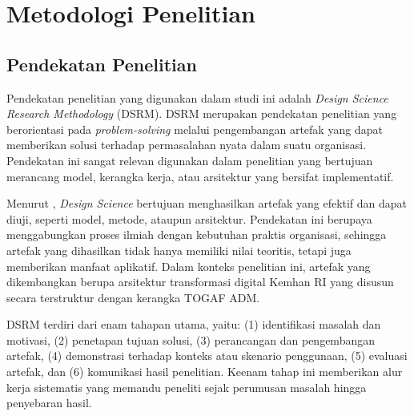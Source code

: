 

\section{Metodologi Penelitian}

\subsection{Pendekatan Penelitian}
Pendekatan penelitian yang digunakan dalam studi ini adalah \textit{Design Science Research Methodology} (DSRM).
DSRM merupakan pendekatan penelitian yang berorientasi pada \textit{problem-solving} melalui pengembangan artefak yang dapat memberikan solusi terhadap permasalahan nyata dalam suatu organisasi.
Pendekatan ini sangat relevan digunakan dalam penelitian yang bertujuan merancang model, kerangka kerja, atau arsitektur yang bersifat implementatif.

Menurut \textcite{Hevner2004}, \textit{Design Science} bertujuan menghasilkan artefak yang efektif dan dapat diuji, seperti model, metode, ataupun arsitektur.
Pendekatan ini berupaya menggabungkan proses ilmiah dengan kebutuhan praktis organisasi, sehingga artefak yang dihasilkan tidak hanya memiliki nilai teoritis, tetapi juga memberikan manfaat aplikatif.
Dalam konteks penelitian ini, artefak yang dikembangkan berupa arsitektur transformasi digital Kemhan RI yang disusun secara terstruktur dengan kerangka TOGAF ADM.

DSRM terdiri dari enam tahapan utama, yaitu: (1) identifikasi masalah dan motivasi, (2) penetapan tujuan solusi, (3) perancangan dan pengembangan artefak, (4) demonstrasi terhadap konteks atau skenario penggunaan, (5) evaluasi artefak, dan (6) komunikasi hasil penelitian.
Keenam tahap ini memberikan alur kerja sistematis yang memandu peneliti sejak perumusan masalah hingga penyebaran hasil.

